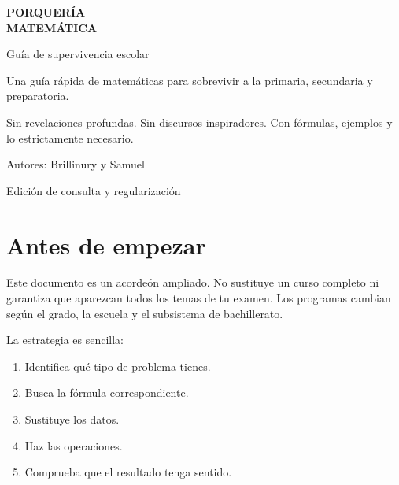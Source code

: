 \documentclass[10pt,oneside]{book}
\begin{document}
	
	
	\begin{titlepage}
		\centering
		\vspace*{2cm}
		
		{\Huge\bfseries PORQUERÍA\\[3mm] MATEMÁTICA\par}
		
		\vspace{1cm}
		{\Large Guía de supervivencia escolar\par}
		
		\vspace{1.5cm}
		\begin{tcolorbox}[
			width=.85\textwidth,
			colback=gris,colframe=tinta,
			arc=2mm,boxrule=1pt
			]
			\centering
			Una guía rápida de matemáticas para sobrevivir
			a la primaria, secundaria y preparatoria.
			
			Sin revelaciones profundas. Sin discursos inspiradores.
			Con fórmulas, ejemplos y lo estrictamente necesario.
		\end{tcolorbox}
		
		\vfill
		
		{\large Autores: Brillinury y Samuel\par}
		
		\vspace{1cm}
		{\small Edición de consulta y regularización\par}
	\end{titlepage}
	
	\frontmatter
	\chapter*{Antes de empezar}
	
	Este documento es un acordeón ampliado. No sustituye un curso
	completo ni garantiza que aparezcan todos los temas de tu examen.
	Los programas cambian según el grado, la escuela y el subsistema
	de bachillerato.
	
	La estrategia es sencilla:
	\begin{enumerate}
		\item Identifica qué tipo de problema tienes.
		\item Busca la fórmula correspondiente.
		\item Sustituye los datos.
		\item Haz las operaciones.
		\item Comprueba que el resultado tenga sentido.
	\end{enumerate}
	
\end{document}
